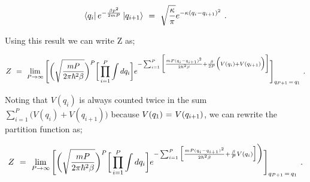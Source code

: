 \documentclass[11pt]{article}
\begin{document}
\begin{equation} \label{wr-eq-27-1}
\bra{q_i} e^{ - \frac{ \beta p^2}{2 m P}} \ket{q_{i+1}} \hspace{0.125cm} = \hspace{0.125cm} \sqrt{\frac{\kappa}{\pi}} e^{- \kappa (q_i - q_{i+1})^2} \hspace{0.125cm} .
\end{equation}

Using this result we can write Z as;

\begin{equation} \label{wr-eq-28-1}
Z \hspace{0.125cm} = \hspace{0.125cm} \lim_{P \rightarrow \infty} \Bigg[ \bigg(\sqrt{\frac{m P}{2 \pi \hbar^2 \beta}}\bigg)^{P} \bigg[ \prod_{i=1}^{P} \int d q_i \bigg] e^{- \sum_{i = 1}^{P} \bigg[ \frac{ m P (q_i - q_{i+1})^2}{2 \hbar^2 \beta} + \frac{\beta}{2P} \Big( V(q_i) + V(q_{i + 1}) \Big) \bigg]} \Bigg]_{q_{P + 1} \hspace{0.05cm} = \hspace{0.05cm} q_1} \hspace{0.125cm} .
\end{equation}

Noting that \begin{math} V(q_i) \end{math} is always counted twice in the sum \begin{math} \sum_{i = 1}^{P} \Big( V(q_i) + V(q_{i + 1}) \Big) \end{math} because \begin{math} V(q_1) \hspace{0.025cm} = \hspace{0.025cm} V(q_{i + 1}) \end{math}, we can rewrite the partition function as; 

\begin{equation} \label{wr-eq-29-3}
Z \hspace{0.125cm} = \hspace{0.125cm} \lim_{P \rightarrow \infty} \Bigg[ \bigg(\sqrt{\frac{m P}{2 \pi \hbar^2 \beta}}\bigg)^{P} \bigg[ \prod_{i=1}^{P} \int d q_i \bigg] e^{- \sum_{i = 1}^{P} \Big[ \frac{ m P (q_i - q_{i+1})^2}{2 \hbar^2 \beta} + \frac{\beta}{P} V(q_i) \Big] \bigg)} \Bigg]_{q_{P + 1} \hspace{0.05cm} = \hspace{0.05cm} q_1} \hspace{0.125cm} .
\end{equation}
\end{document}
